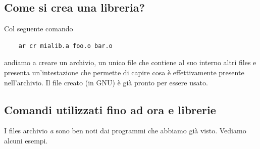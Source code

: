 \subsection{Come si crea una libreria?} Col seguente comando
\begin{verbatim}
	ar cr mialib.a foo.o bar.o
\end{verbatim}
andiamo a creare un archivio, un unico file che contiene al suo interno altri files e presenta un'intestazione che permette di capire cosa è effettivamente presente nell'archivio. Il file creato (in GNU) è già pronto per essere usato.
\clearpage
\subsection{Comandi utilizzati fino ad ora e librerie}
I files archivio \emph{a} sono ben noti dai programmi che abbiamo già visto. Vediamo alcuni esempi.
